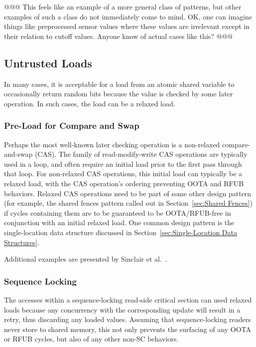 \documentclass[10]{article}
\begin{document}
@@@ This feels like an example of a more general class of patterns,
but other examples of such a class do not immediately come to mind.
OK, one can imagine things like preprocessed sensor values where these
values are irrelevant except in their relation to cutoff values.
Anyone know of actual cases like this?
@@@

\subsection{Untrusted Loads}
\label{sec:Untrusted Loads}

In many cases, it is acceptable for a load from an atomic shared variable
to occasionally return random bits because the value is checked by
some later operation.
In such cases, the load can be a relaxed load.

\subsubsection{Pre-Load for Compare and Swap}
\label{sec:Pre-Load for Compare and Swap}

Perhaps the most well-known later checking operation is a non-relaxed
compare-and-swap (CAS).
The  family of read-modify-write
CAS operations are typically used in a loop, and often require an initial
load prior to the first pass through that loop.
For non-relaxed CAS operations, this initial load can typically be a
relaxed load, with the CAS operation's ordering preventing OOTA and RFUB
behaviors.
Relaxed CAS operations need to be part of some other design pattern
(for example, the shared fences pattern called out in
Section~\ref{sec:Shared Fences})
if cycles containing them are to be guaranteed to be OOTA/RFUB-free in
conjunction with an initial relaxed load.
One common design pattern is the single-location data structure discussed in
Section~\ref{sec:Single-Location Data Structures}.

Additional examples are presented by
Sinclair et al.~\cite{Sinclair:2017:CAR:3079856.3080206}.

\subsubsection{Sequence Locking}
\label{sec:Sequence Locking}

The accesses within a sequence-locking read-side critical section
can used relaxed loads because any concurrency with the corresponding
update will result in a retry, thus discarding any loaded values.
Assuming that sequence-locking readers never store to shared memory,
this not only prevents the surfacing of any OOTA or RFUB cycles, but
also of any other non-SC behaviors.
\end{document}

